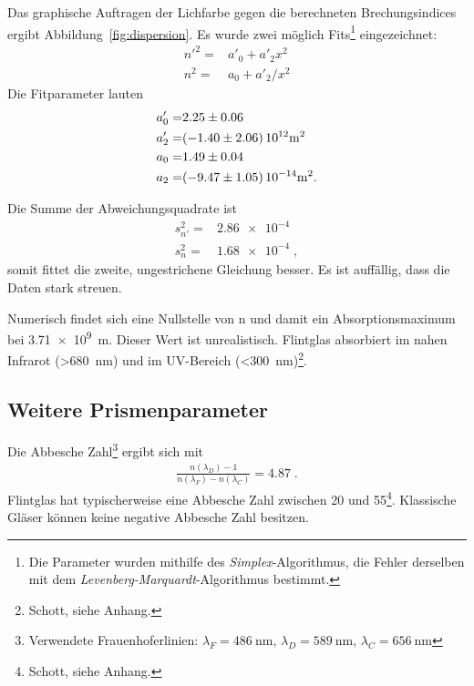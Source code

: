     Das graphische Auftragen der Lichfarbe gegen die berechneten Brechungsindices ergibt Abbildung~\ref{fig:dispersion}. Es wurde zwei möglich Fits\footnote{Die Parameter wurden mithilfe des \emph{Simplex}-Algorithmus, die Fehler derselben mit dem \emph{Levenberg-Marquardt}-Algorithmus bestimmt.} eingezeichnet:
    \begin{align}\label{equ:fits}
        {n'}^2    =&  a'_0 + a'_2 x^2\\
        n^2     =&  a_0 + a'_2/x^2
    \end{align}
    Die Fitparameter lauten
    \begin{align}\label{equ:params}
        a'_0 =& \num{2.25+-0.06} \\
        a'_2 =& \SI{-1.40+-2.06}{10^{12} \m^2}\\
        a_0 =& \num{1.49+-0.04} \\
        a_2 =& \SI{-9.47+-1.05}{10^{-14} \m^2}.
    \end{align}

    Die Summe der Abweichungsquadrate ist
    \begin{align}\label{equ:abweichungsquad}
        s_{n'}^2  =& \num{2.86e-4}\\
        s_n^2   =& \num{1.68e-4} \;,
    \end{align}
    somit fittet die zweite, ungestrichene Gleichung besser. 
    Es ist auffällig, dass die Daten stark streuen.


    Numerisch findet sich eine Nullstelle von n und damit ein Absorptionsmaximum bei \SI{3.71e9}{\m}. Dieser Wert ist unrealistisch. Flintglas absorbiert im nahen Infrarot (\SI{>680}{\nano\m}) und im UV-Bereich (\SI{<300}{\nano\m})\footnote{Schott, siehe Anhang.}.


\subsection{Weitere Prismenparameter} 
\label{sub:weitere_prismenparameter}
    Die Abbesche Zahl\footnote{
    Verwendete Frauenhoferlinien:
    $\lambda_F = \SI{486}{\nano\m}$,
    $\lambda_D = \SI{589}{\nano\m}$,
    $\lambda_C = \SI{656}{\nano\m}$
    } ergibt sich mit 
    \begin{align}\label{equ:abbe}
        \frac{n(\lambda_D)-1}{n(\lambda_F)-n(\lambda_C)} = \num{4.87} \;.
    \end{align}
    Flintglas hat typischerweise eine Abbesche Zahl zwischen 20 und 55\footnote{Schott, siehe Anhang.}. Klassische Gläser können keine negative Abbesche Zahl besitzen. 

